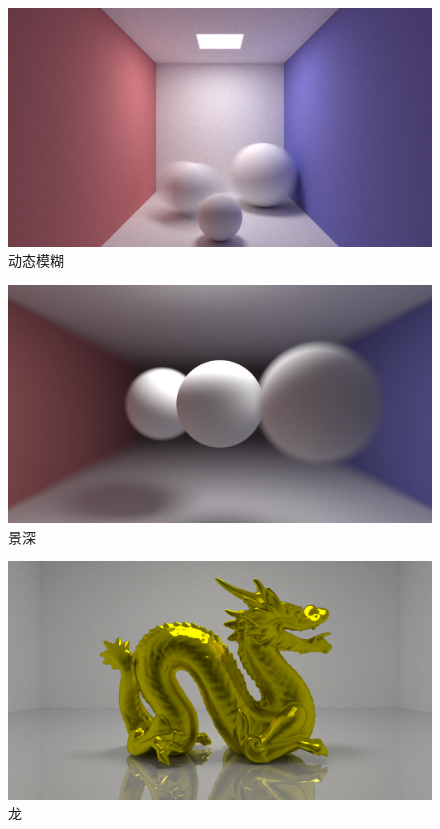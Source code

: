 \documentclass[cn]{report}
\begin{document}
    \begin{figure}[htbp]
        \centering
        \includegraphics[width=\linewidth]{../results/motion.png}
        \caption{动态模糊}
        \label{fig:motion}
    \end{figure}

    \begin{figure}[htbp]
        \centering
        \includegraphics[width=\linewidth]{../results/cornell-depth.png}
        \caption{景深}
        \label{fig:depth}
    \end{figure}

    \begin{figure}[htbp]
        \centering
        \includegraphics[width=\linewidth]{../results/dragon.png}
        \caption{龙}
        \label{fig:dragon}
    \end{figure}
\end{document}
